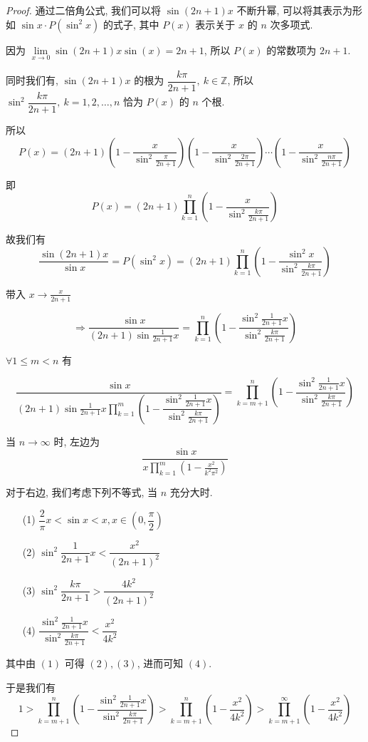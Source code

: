 \begin{proof}
	通过二倍角公式, 我们可以将 $\sin(2n+1)x$ 不断升幂, 可以将其表示为形如 $\sin x \cdot P(\sin^2 x)$ 的式子, 其中 $P(x)$ 表示关于 $x$ 的 $n$ 次多项式.

	因为 $\lim\limits_{x \to 0}{\sin(2n+1)x}{\sin(x)}=2n+1$, 所以 $P(x)$ 的常数项为 $2n+1$.

	同时我们有, $\sin(2n+1)x$ 的根为 $\dfrac{k\pi}{2n+1},\ k \in \mathbb Z$, 所以 $\sin^2\dfrac{k\pi}{2n+1},\ k=1,2,\ldots,n$ 恰为 $P(x)$ 的 $n$ 个根.

	所以
	$$P(x)=(2n+1)\left(1-\dfrac{x}{\sin^2\frac \pi {2n+1}}\right)\left(1-\dfrac{x}{\sin^2 \frac {2\pi} {2n+1}}\right)\cdots\left(1-\dfrac{x}{\sin^2 \frac{n\pi}{2n+1}}\right)$$

	即
	$$P(x)=(2n+1)\prod\limits_{k=1}^n\left(1-\dfrac{x}{\sin^2\frac{k\pi}{2n+1}}\right)$$

	故我们有
	$$\dfrac{\sin(2n+1)x}{\sin x}=P(\sin^2x)=(2n+1)\prod\limits_{k=1}^n\left(1-\dfrac{\sin^2 x}{\sin^2\frac{k\pi}{2n+1}}\right)$$

	带入 $x\to\frac{x}{2n+1}$

	$$\Rightarrow \dfrac{\sin x}{(2n+1)\sin\frac 1 {2n+1}x}=\prod\limits_{k=1}^n\left(1-\dfrac{\sin^2 \frac 1 {2n+1} x}{\sin^2 \frac {k\pi}{2n+1  }}\right)$$

	$\forall 1 \leqslant m<n$ 有

	$$\dfrac{\sin x}{(2n+1)\sin\frac 1 {2n+1}x \prod\limits_{k=1}^m\left(1-\dfrac{\sin^2 \frac 1 {2n+1} x}{\sin^2 \frac {k\pi}{2n+1  }}\right)}=\prod\limits_{k=m+1}^n\left(1-\dfrac{\sin^2 \frac 1 {2n+1} x}{\sin^2 \frac {k\pi}{2n+1  }}\right)$$

	当 $n \to \infty$ 时, 左边为
	$$\dfrac{\sin x}{x\prod\limits_{k=1}^m\left(1-\frac{x^2}{k^2\pi^2}\right)}$$

	对于右边, 我们考虑下列不等式, 当 $n$ 充分大时.
	\begin{itemize}[leftmargin=2cm]
		\item[(1)] $\dfrac 2 \pi x< \sin x < x, x\in (0,\dfrac \pi 2)$
		\item[(2)] $\sin^2\dfrac{1}{2n+1}x<\dfrac{x^2}{(2n+1)^2}$
		\item[(3)] $\sin^2 \dfrac{k\pi}{2n+1}>\dfrac{4k^2}{(2n+1)^2}$
		\item[(4)] $\dfrac{\sin^2\frac{1}{2n+1}x}{\sin^2\frac{k\pi}{2n+1}}<\dfrac{x^2}{4k^2}$
	\end{itemize}

	其中由 $(1)$ 可得 $(2),(3)$, 进而可知 $(4)$.

	于是我们有
	$$1>\prod\limits_{k=m+1}^n\left(1-\dfrac{\sin^2 \frac 1 {2n+1}x}{\sin^2\frac{k\pi}{2n+1}}\right)>\prod\limits_{k=m+1}^n\left(1-\dfrac{x^2}{4k^2}\right)>\prod\limits_{k=m+1}^\infty\left(1-\dfrac{x^2}{4k^2}\right)$$


\end{proof}
